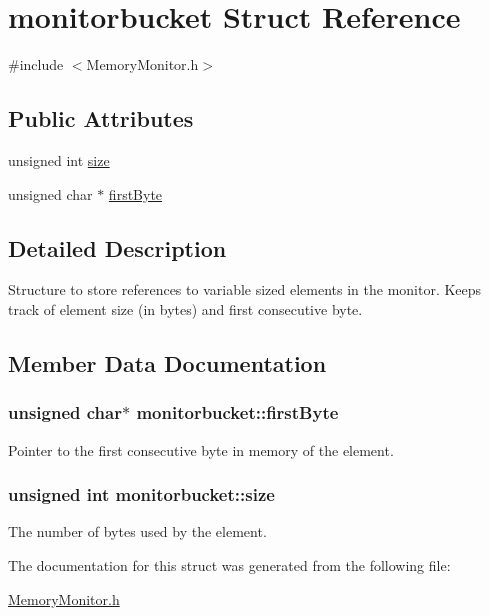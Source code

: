\hypertarget{structmonitorbucket}{
\section{monitorbucket Struct Reference}
\label{structmonitorbucket}
}


{\ttfamily \#include $<$MemoryMonitor.h$>$}

\subsection*{Public Attributes}
\begin{DoxyCompactItemize}
\item 
unsigned int \hyperlink{structmonitorbucket_adbeb5d62c4449e3db54c8de743bee2bc}{size}
\item 
unsigned char $\ast$ \hyperlink{structmonitorbucket_a680553e4dc358c300edcd99279928a54}{firstByte}
\end{DoxyCompactItemize}


\subsection{Detailed Description}
Structure to store references to variable sized elements in the monitor. Keeps track of element size (in bytes) and first consecutive byte. 

\subsection{Member Data Documentation}
\hypertarget{structmonitorbucket_a680553e4dc358c300edcd99279928a54}{
\subsubsection[{firstByte}]{\setlength{\rightskip}{0pt plus 5cm}unsigned char$\ast$ {\bf monitorbucket::firstByte}}}
\label{structmonitorbucket_a680553e4dc358c300edcd99279928a54}
Pointer to the first consecutive byte in memory of the element. \hypertarget{structmonitorbucket_adbeb5d62c4449e3db54c8de743bee2bc}{
\subsubsection[{size}]{\setlength{\rightskip}{0pt plus 5cm}unsigned int {\bf monitorbucket::size}}}
\label{structmonitorbucket_adbeb5d62c4449e3db54c8de743bee2bc}
The number of bytes used by the element. 

The documentation for this struct was generated from the following file:\begin{DoxyCompactItemize}
\item 
\hyperlink{MemoryMonitor_8h}{MemoryMonitor.h}\end{DoxyCompactItemize}
